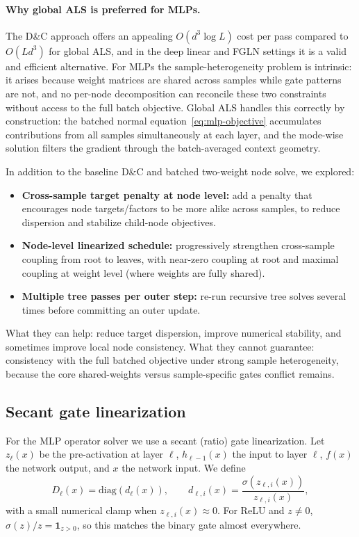 \documentclass{article}
\begin{document}
\paragraph{Why global ALS is preferred for MLPs.}
The D\&C approach offers an appealing $O(d^3 \log L)$ cost per pass
compared to $O(Ld^3)$ for global ALS, and in the deep linear and FGLN
settings it is a valid and efficient alternative.
For MLPs the sample-heterogeneity problem is intrinsic: it arises because
weight matrices are shared across samples while gate patterns are not,
and no per-node decomposition can reconcile these two constraints without
access to the full batch objective.
Global ALS handles this correctly by construction: the batched normal
equation~\eqref{eq:mlp-objective} accumulates contributions from all samples
simultaneously at each layer, and the mode-wise solution filters the gradient
through the batch-averaged context geometry.


In addition to the baseline D\&C and batched two-weight node solve, we explored:
\begin{itemize}
  \item \textbf{Cross-sample target penalty at node level:}
  add a penalty that encourages node targets/factors to be more alike across
  samples, to reduce dispersion and stabilize child-node objectives.
  \item \textbf{Node-level linearized schedule:}
  progressively strengthen cross-sample coupling from root to leaves, with near-zero
  coupling at root and maximal coupling at weight level (where weights are fully shared).
  \item \textbf{Multiple tree passes per outer step:}
  re-run recursive tree solves several times before committing an outer update.
\end{itemize}

What they can help: reduce target dispersion, improve numerical stability, and
sometimes improve local node consistency.
What they cannot guarantee: consistency with the full batched objective under
strong sample heterogeneity, because the core shared-weights versus sample-specific
gates conflict remains.


\subsection{Secant gate linearization}
\label{app:secant}

For the MLP operator solver we use a secant (ratio) gate linearization.
Let $z_\ell(x)$ be the pre-activation at layer $\ell$, $h_{\ell-1}(x)$ the input
to layer $\ell$, $f(x)$ the network output, and $x$ the network input.
We define
\[
D_\ell(x)=\mathrm{diag}(d_\ell(x)),
\qquad
d_{\ell,i}(x)=\frac{\sigma(z_{\ell,i}(x))}{z_{\ell,i}(x)},
\]
with a small numerical clamp when $z_{\ell,i}(x)\approx 0$.
For ReLU and $z\neq 0$, $\sigma(z)/z=\mathbf{1}_{z>0}$, so this matches the
binary gate almost everywhere.
\end{document}

